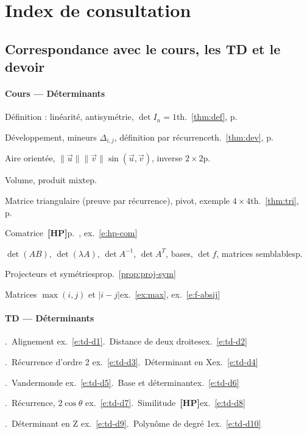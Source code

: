 \documentclass[a4paper,11pt]{article}
\numberwithin{equation}{section}
\numberwithin{figure}{section}
\numberwithin{table}{section}
\theoremstyle{enonce}
\theoremstyle{exemple}
\theoremstyle{remarque}
\newcommand{\ve}[1]{\vec{#1}}
\newcommand{\HP}{\,{\sffamily\bfseries\scriptsize\textcolor{Brique}{[HP]}}}
\begin{document}
\section*{Index de consultation}\label{sec:index}

\subsection*{Correspondance avec le cours, les TD et le devoir}\label{sec:corresp}
{\footnotesize
\paragraph{Cours --- Déterminants}
\noindent Définition : linéarité, antisymétrie, $\det I_n=1$\dotfill th.~\ref{thm:def}, p.~\pageref{thm:def}\par
\noindent Développement, mineurs $\Delta_{i,j}$, définition par récurrence\dotfill th.~\ref{thm:dev}, p.~\pageref{thm:dev}\par
\noindent Aire orientée, $\|\ve u\|\|\ve v\|\sin(\ve u,\ve v)$, inverse $2\times2$\dotfill p.~\pageref{prop:col}\par
\noindent Volume, produit mixte\dotfill p.~\pageref{eq:det3}\par
\noindent Matrice triangulaire (preuve par récurrence), pivot, exemple $4\times4$\dotfill th.~\ref{thm:tri}, p.~\pageref{thm:tri}\par
\noindent Comatrice \HP\dotfill p.~\pageref{hp:comatrice}, ex.~\ref{e:hp-com}\par
\noindent $\det(AB)$, $\det(\lambda A)$, $\det A^{-1}$, $\det A^T$, bases, $\det f$, matrices semblables\dotfill p.~\pageref{thm:fond}\par
\noindent Projecteurs et symétries\dotfill prop.~\ref{prop:proj-sym}\par
\noindent Matrices $\max(i,j)$ et $|i-j|$\dotfill ex.~\ref{ex:max}, ex.~\ref{e:f-absij}\par
\paragraph{TD --- Déterminants}
.~Alignement \dotfill ex.~\ref{e:td-d1}.~Distance de deux droites\dotfill ex.~\ref{e:td-d2}\par
{}.~Récurrence d'ordre 2 \dotfill ex.~\ref{e:td-d3}.~Déterminant en X\dotfill ex.~\ref{e:td-d4}\par
{}.~Vandermonde \dotfill ex.~\ref{e:td-d5}.~Base et déterminant\dotfill ex.~\ref{e:td-d6}\par
{}.~Récurrence, $2\cos\theta$ \dotfill ex.~\ref{e:td-d7}.~Similitude \HP\dotfill ex.~\ref{e:td-d8}\par
{}.~Déterminant en Z \dotfill ex.~\ref{e:td-d9}.~Polynôme de degré 1\dotfill ex.~\ref{e:td-d10}\par
}
\end{document}
